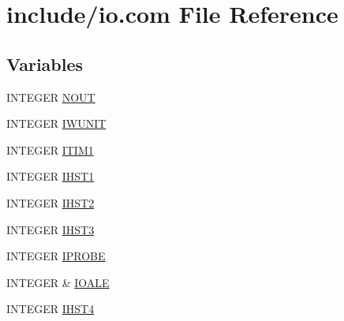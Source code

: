 \hypertarget{io_8com}{\section{include/io.com File Reference}
\label{io_8com}
}
\subsection*{Variables}
\begin{DoxyCompactItemize}
\item 
I\-N\-T\-E\-G\-E\-R \hyperlink{io_8com_a2e833b9a395a744ecefcf46dd72e80f6}{N\-O\-U\-T}
\item 
I\-N\-T\-E\-G\-E\-R \hyperlink{io_8com_aa33f1e031443e69cd1ea5bc66aa1a655}{I\-W\-U\-N\-I\-T}
\item 
I\-N\-T\-E\-G\-E\-R \hyperlink{io_8com_a27f7b0361aa0add307ec02f9f5e83ab9}{I\-T\-I\-M1}
\item 
I\-N\-T\-E\-G\-E\-R \hyperlink{io_8com_a55a72b315d622d8470187d5b804a26fe}{I\-H\-S\-T1}
\item 
I\-N\-T\-E\-G\-E\-R \hyperlink{io_8com_ab66ef6ade746503f5f307b652925713c}{I\-H\-S\-T2}
\item 
I\-N\-T\-E\-G\-E\-R \hyperlink{io_8com_a57fdce59558d18766a22994722ef0686}{I\-H\-S\-T3}
\item 
I\-N\-T\-E\-G\-E\-R \hyperlink{io_8com_ac78fec03b038d9855f9e7bd52236485b}{I\-P\-R\-O\-B\-E}
\item 
I\-N\-T\-E\-G\-E\-R \& \hyperlink{io_8com_af3a420e98cd1488f16cf7fc91a9cc47a}{I\-O\-A\-L\-E}
\item 
I\-N\-T\-E\-G\-E\-R \hyperlink{io_8com_a327b93c1358b3026bb2b496c88b06de9}{I\-H\-S\-T4}
\end{DoxyCompactItemize}


